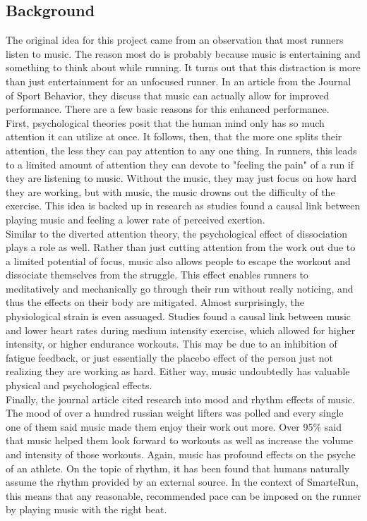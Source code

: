 \documentclass[twoside]{article}
\begin{document}
\begin{multicols}{2}

\section{Background}
\indent The original idea for this project came from an observation that most runners listen to music. The reason most do is probably because music is entertaining and something to think about while running. It turns out that this distraction is more than just entertainment for an unfocused runner. In an article from the Journal of Sport Behavior, they discuss that music can actually allow for improved performance. There are a few basic reasons for this enhanced performance. \\

	First, psychological theories posit that the human mind only has so much attention it can utilize at once. It follows, then, that the more one splits their attention, the less they can pay attention to any one thing. In runners, this leads to a limited amount of attention they can devote to "feeling the pain" of a run if they are listening to music. Without the music, they may just focus on how hard they are working, but with music, the music drowns out the difficulty of the exercise. This idea is backed up in research as studies found a causal link between playing music and feeling a lower rate of perceived exertion. \\
	
	Similar to the diverted attention theory, the psychological effect of dissociation plays a role as well. Rather than just cutting attention from the work out due to a limited potential of focus, music also allows people to escape the workout and dissociate themselves from the struggle. This effect enables runners to meditatively and mechanically go through their run without really noticing, and thus the effects on their body are mitigated. Almost surprisingly, the physiological strain is even assuaged. Studies found a causal link between music and lower heart rates during medium intensity exercise, which allowed for higher intensity, or higher endurance workouts. This may be due to an inhibition of fatigue feedback, or just essentially the placebo effect of the person just not realizing they are working as hard. Either way, music undoubtedly has valuable physical and psychological effects. \\
	
	Finally, the journal article cited research into mood and rhythm effects of music. The mood of over a hundred russian weight lifters was polled and every single one of them said music made them enjoy their work out more. Over 95\% said that music helped them look forward to workouts as well as increase the volume and intensity of those workouts. Again, music has profound effects on the psyche of an athlete. On the topic of rhythm, it has been found that humans naturally assume the rhythm provided by an external source. In the context of SmarteRun, this means that any reasonable, recommended pace can be imposed on the runner by playing music with the right beat. \\
	

\end{multicols}
\end{document}
